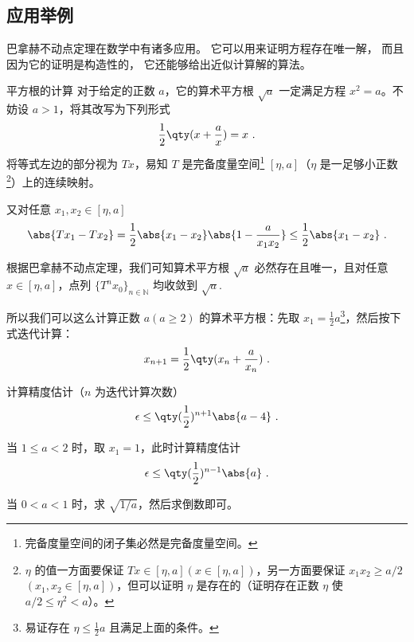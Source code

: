 \subsection{应用举例}
巴拿赫不动点定理在数学中有诸多应用。 它可以用来证明方程存在唯一解， 而且因为它的证明是构造性的， 它还能够给出近似计算解的算法。

\begin{example}{平方根的计算}
对于给定的正数 $a$，它的算术平方根 $\sqrt{a}$ 一定满足方程 $x^2=a$。不妨设 $a>1$，将其改写为下列形式
\begin{equation}
\frac{1}{2}\qty(x+\frac{a}{x})=x~.
\end{equation}
将等式左边的部分视为 $Tx$，易知 $T$ 是完备度量空间\footnote{完备度量空间的闭子集必然是完备度量空间。} $[\eta,a]$（$\eta$ 是一足够小正数\footnote{$\eta$ 的值一方面要保证 $Tx\in[\eta,a](x\in[\eta,a])$，另一方面要保证 $x_1x_2 \geq a/2$ $(x_1,x_2\in[\eta,a])$，但可以证明 $\eta$ 是存在的（证明存在正数 $\eta$ 使 $a/2\leq \eta^2<a$）。}）上的连续映射。

又对任意 $x_1,x_2\in [\eta,a]$
\begin{equation}
\abs{Tx_1 -  Tx_2}=\frac{1}{2}\abs{x_1 - x_2}\abs{1-\frac{a}{x_1x_2}}\leq\frac{1}{2}\abs{x_1 - x_2}~.
\end{equation}

根据巴拿赫不动点定理，我们可知算术平方根 $\sqrt{a}$ 必然存在且唯一，且对任意 $x\in[\eta,a]$，点列 $\{T^nx_0\}_{n\in\mathbb{N}}$ 均收敛到 $\sqrt{a}$.

所以我们可以这么计算正数 $a(a\geq 2)$ 的算术平方根：先取 $x_1=\frac{1}{2}a$\footnote{易证存在 $\eta\leq\frac{1}{2}a$ 且满足上面的条件。}，然后按下式迭代计算：
\begin{equation}
x_{n+1}=\frac{1}{2}\qty(x_n+\frac{a}{x_n})~.
\end{equation}

计算精度估计（$n$ 为迭代计算次数）
\begin{equation}
\epsilon\leq\qty(\frac{1}{2})^{n+1}\abs{a-4}~.
\end{equation}

当 $1\leq a<2$ 时，取 $x_1=1$，此时计算精度估计
\begin{equation}
\epsilon\leq\qty(\frac{1}{2})^{n-1}\abs{a}~.
\end{equation}

当 $0<a<1$ 时，求 $\sqrt{1/a}$，然后求倒数即可。
\end{example}
